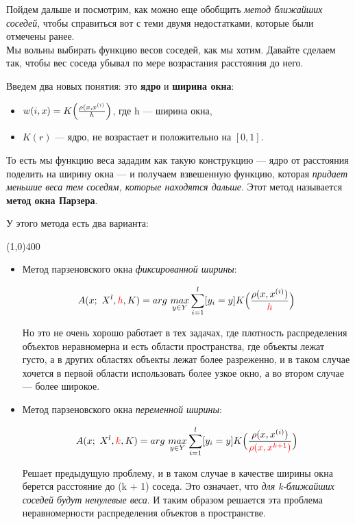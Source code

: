 \documentclass{article}
\begin{document}
Пойдем дальше и посмотрим, как можно еще обобщить \textit{метод ближайших соседей}, чтобы справиться вот с теми двумя недостатками, которые были отмечены ранее. 
\\

Мы вольны выбирать функцию весов соседей, как мы хотим. Давайте сделаем так, чтобы вес соседа убывал по мере возрастания расстояния до него. 

Введем два новых понятия: это \textbf{ядро} и \textbf{ширина окна}:

\begin{itemize}
\item[] $w(i, x) = K\Bigl(\frac{\rho(x, x^{(i)}}{h}\Bigr)$, где h --- ширина окна,

\item[] $K(r)$ --- ядро, не возрастает и положительно на $[0, 1]$.
\end{itemize}

То есть мы функцию веса зададим как такую конструкцию --- ядро от расстояния поделить на ширину окна ---  и получаем взвешенную функцию, которая \textit{придает меньшие веса тем соседям, которые находятся дальше}.  Этот метод называется \textbf{метод окна Парзера}.

У этого метода есть два варианта:

\begin{center}
\line(1,0){400}
\end{center}

\begin{itemize}
\item Метод парзеновского окна \textit{фиксированной ширины}:

$$A(x;\ X^l, \textcolor{red}{h}, K) = arg\ \underset{y \in Y}{max}
\sum\limits_{i = 1}^l[y_i = y]K\Bigl(\frac{\rho(x, x^{(i)})}{\textcolor{red}{h}}\Bigr)$$

Но это не очень хорошо работает в тех задачах, где плотность распределения объектов неравномерна и есть области пространства, где объекты лежат густо, а в других областях объекты лежат более разреженно, и в таком случае хочется в первой области использовать более узкое окно, а во втором случае --- более широкое.

\item Метод парзеновского окна \textit{переменной ширины}:

$$A(x;\ X^l, \textcolor{red}{k}, K) = arg\ \underset{y \in Y}{max}
\sum\limits_{i = 1}^l[y_i = y]K\Bigl(\frac{\rho(x, x^{(i)})}
{\textcolor{red}{\rho(x, x^{k + 1})}}
\Bigr)$$

Решает предыдущую проблему, и в таком случае в качестве ширины окна берется расстояние до (k + 1) соседа. Это означает, что \textit{для k-ближайших соседей будут ненулевые веса}. И таким образом решается эта проблема неравномерности распределения объектов в пространстве.

\end{itemize}
\end{document}
